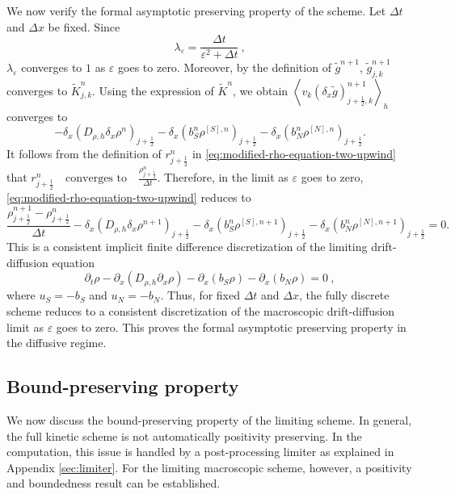 \documentclass[11pt,twoside]{article}
\numberwithin{equation}{section}
\theoremstyle{plain}
\theoremstyle{nonumberplain}
\begin{document}
{{We now verify the formal asymptotic preserving property of the scheme.
Let \(\Delta t\) and \(\Delta x\) be fixed. Since
\[
\lambda_\varepsilon
=
\frac{\Delta t}{\varepsilon^2+\Delta t}\ ,
\]
\(\lambda_\varepsilon\) converges to \(1\) as \(\varepsilon\) goes to zero.
Moreover, by the definition of \(\widetilde g^{n+1}\),
\(\widetilde g_{j,k}^{n+1}\) converges to \(\widetilde K_{j,k}^{n}\).
Using the expression of \(\widetilde K^n\), we obtain \(\left\langle
v_k(\delta_x\widetilde g)_{j+\frac12,k}^{n+1}
\right\rangle_h\) converges to
\[
-\delta_x\left(D_{\rho,h}\delta_x\rho^n\right)_{j+\frac12}
-
\delta_x\left(b_S^n\rho^{[S],n}\right)_{j+\frac12}
-
\delta_x\left(b_N^n\rho^{[N],n}\right)_{j+\frac12}.
\]
It follows from the definition of \(r_{j+\frac12}^n\) in
\eqref{eq:modified-rho-equation-two-upwind} that
\(
r_{j+\frac12}^n
\quad\text{converges to}\quad
\frac{\rho_{j+\frac12}^n}{\Delta t}.
\)
Therefore, in the limit as \(\varepsilon\) goes to zero,
\eqref{eq:modified-rho-equation-two-upwind} reduces to
\begin{equation}\label{eq:limiting-density-scheme}
\frac{\rho_{j+\frac12}^{n+1}-\rho_{j+\frac12}^{n}}{\Delta t}
-
\delta_x\left(
D_{\rho,h}\delta_x\rho^{n+1}
\right)_{j+\frac12}
-
\delta_x\left(
b_S^n\rho^{[S],n+1}
\right)_{j+\frac12}
-
\delta_x\left(
b_N^n\rho^{[N],n+1}
\right)_{j+\frac12}
=0 .
\end{equation}
This is a consistent implicit finite difference discretization of the
limiting drift-diffusion equation
\[
\partial_t\rho
-
\partial_x\left(D_{\rho,h}\partial_x\rho\right)
-
\partial_x\left(b_S\rho\right)
-
\partial_x\left(b_N\rho\right)
=0\ ,
\]
where \(u_S=-b_S\) and \(u_N=-b_N\).
Thus, for fixed \(\Delta t\) and \(\Delta x\), the fully discrete scheme
reduces to a consistent discretization of the macroscopic drift-diffusion
limit as \(\varepsilon\) goes to zero. This proves the formal asymptotic
preserving property in the diffusive regime.

\subsection{Bound-preserving property}

We now discuss the bound-preserving property of the limiting scheme.
In general, the full kinetic scheme is not automatically positivity
preserving. In the computation, this issue is handled by a post-processing
limiter as explained in Appendix \ref{sec:limiter}. For the limiting macroscopic scheme, however, a positivity and
boundedness result can be established.

}}
\end{document}

